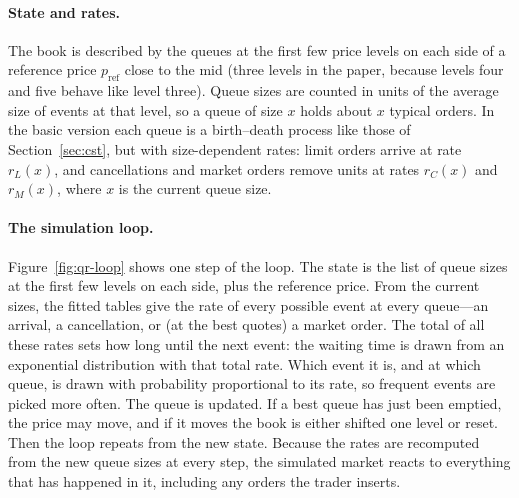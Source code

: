 \paragraph{State and rates.} The book is described by the queues at the first few price levels on each
side of a reference price $p_{\text{ref}}$ close to the mid (three levels in the paper, because levels
four and five behave like level three). Queue sizes are counted in units of
the average size of events at that level, so a queue of size $x$ holds about $x$ typical orders. In the
basic version each queue is a birth--death process like those of Section~\ref{sec:cst}, but with
size-dependent rates: limit orders arrive at rate $r_L(x)$, and cancellations and market orders remove
units at rates $r_C(x)$ and $r_M(x)$, where $x$ is the current queue size.

\paragraph{The simulation loop.} Figure~\ref{fig:qr-loop} shows one step of the loop. The state is the
list of queue sizes at the first few levels on each side, plus the reference price. From the current
sizes, the fitted tables give the rate of every possible event at every queue---an arrival, a
cancellation, or (at the best quotes) a market order. The total of all these rates sets how long until
the next event: the waiting time is drawn from an exponential distribution with that total rate. Which
event it is, and at which queue, is drawn with probability proportional to its rate, so frequent events
are picked more often. The queue is updated. If a best queue has just been emptied, the price may move,
and if it moves the book is either shifted one level or reset. Then the loop repeats from the new state.
Because the rates are recomputed from the new queue sizes at every step, the simulated market reacts
to everything that has happened in it, including any orders the trader inserts.


